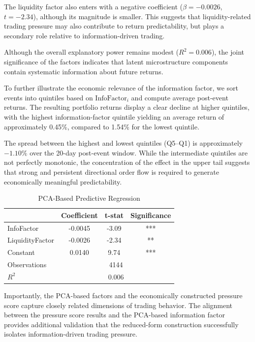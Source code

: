 The liquidity factor also enters with a negative coefficient ($\beta = -0.0026$, $t = -2.34$), although its magnitude is smaller. This suggests that liquidity-related trading pressure may also contribute to return predictability, but plays a secondary role relative to information-driven trading.

Although the overall explanatory power remains modest ($R^2 = 0.006$), the joint significance of the factors indicates that latent microstructure components contain systematic information about future returns.

To further illustrate the economic relevance of the information factor, we sort events into quintiles based on $\text{InfoFactor}_i$ and compute average post-event returns. The resulting portfolio returns display a clear decline at higher quintiles, with the highest information-factor quintile yielding an average return of approximately 0.45\%, compared to 1.54\% for the lowest quintile.

The spread between the highest and lowest quintiles (Q5--Q1) is approximately $-1.10\%$ over the 20-day post-event window. While the intermediate quintiles are not perfectly monotonic, the concentration of the effect in the upper tail suggests that strong and persistent directional order flow is required to generate economically meaningful predictability.
\begin{table}[!t]
\centering
\caption{PCA-Based Predictive Regression}
\label{tab:pca_regression}
\begin{tabular}{lccc}
\hline
 & Coefficient & t-stat & Significance \\
\hline
InfoFactor & -0.0045 & -3.09 & *** \\
LiquidityFactor & -0.0026 & -2.34 & ** \\
Constant & 0.0140 & 9.74 & *** \\
\hline
Observations & \multicolumn{3}{c}{4144} \\
$R^2$ & \multicolumn{3}{c}{0.006} \\
\hline
\end{tabular}
\end{table}

Importantly, the PCA-based factors and the economically constructed pressure score capture closely related dimensions of trading behavior. The alignment between the pressure score results and the PCA-based information factor provides additional validation that the reduced-form construction successfully isolates information-driven trading pressure.

